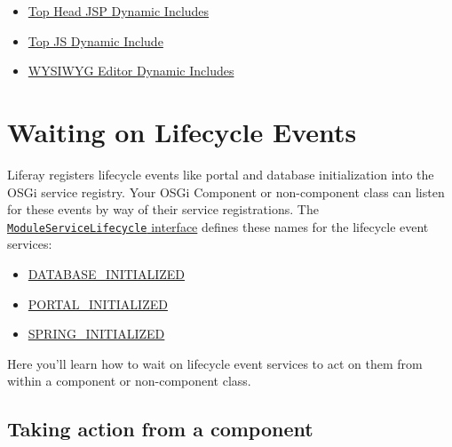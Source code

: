 \begin{itemize}
\tightlist
\item
  \href{/docs/7-2/customization/-/knowledge_base/c/top-head-jsp-dynamic-includes}{Top
  Head JSP Dynamic Includes}
\item
  \href{/docs/7-2/customization/-/knowledge_base/c/top-js-dynamic-include}{Top
  JS Dynamic Include}
\item
  \href{/docs/7-2/customization/-/knowledge_base/c/wysiwyg-editor-dynamic-includes}{WYSIWYG
  Editor Dynamic Includes}
\end{itemize}

\chapter{Waiting on Lifecycle Events}\label{waiting-on-lifecycle-events}

Liferay registers lifecycle events like portal and database
initialization into the OSGi service registry. Your OSGi Component or
non-component class can listen for these events by way of their service
registrations. The
\href{https://docs.liferay.com/dxp/portal/7.2-latest/javadocs/portal-kernel/com/liferay/portal/kernel/module/framework/ModuleServiceLifecycle.html}{\texttt{ModuleServiceLifecycle}
interface} defines these names for the lifecycle event services:

\begin{itemize}
\tightlist
\item
  \href{https://docs.liferay.com/dxp/portal/7.2-latest/javadocs/portal-kernel/constant-values.html\#com.liferay.portal.kernel.module.framework.ModuleServiceLifecycle.DATABASE_INITIALIZED}{DATABASE\_INITIALIZED}
\item
  \href{https://docs.liferay.com/dxp/portal/7.2-latest/javadocs/portal-kernel/constant-values.html\#com.liferay.portal.kernel.module.framework.ModuleServiceLifecycle.PORTAL_INITIALIZED}{PORTAL\_INITIALIZED}
\item
  \href{https://docs.liferay.com/dxp/portal/7.2-latest/javadocs/portal-kernel/constant-values.html\#com.liferay.portal.kernel.module.framework.ModuleServiceLifecycle.SPRING_INITIALIZED}{SPRING\_INITIALIZED}
\end{itemize}

Here you'll learn how to wait on lifecycle event services to act on them
from within a component or non-component class.

\section{Taking action from a
component}\label{taking-action-from-a-component}

